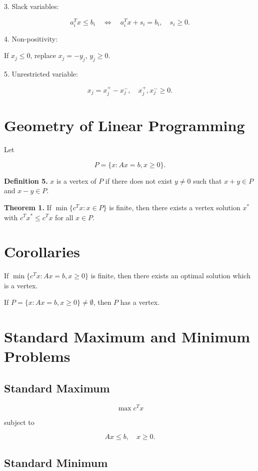 \documentclass[12pt]{article}
\begin{document}
3. Slack variables:

\[
a_i^T x \le b_i
\quad \Longleftrightarrow \quad
a_i^T x + s_i = b_i,
\quad s_i \ge 0.
\]

4. Non-positivity:

If $x_j \le 0$, replace $x_j = -y_j$, $y_j \ge 0$.

5. Unrestricted variable:

\[
x_j = x_j^+ - x_j^-,
\quad x_j^+, x_j^- \ge 0.
\]

\section{Geometry of Linear Programming}

Let

\[
P = \{x : Ax=b, x \ge 0\}.
\]

\textbf{Definition 5.}  
$x$ is a vertex of $P$ if there does not exist $y \neq 0$ such that
$x+y \in P$ and $x-y \in P$.

\textbf{Theorem 1.}  
If $\min \{c^T x : x\in P\}$ is finite, then there exists a vertex solution $x^*$ with
$c^T x^* \le c^T x$ for all $x \in P$.

\section{Corollaries}

If $\min\{c^T x : Ax=b, x\ge 0\}$ is finite, then there exists an optimal solution which is a vertex.

If $P=\{x:Ax=b, x\ge 0\}\neq \emptyset$, then $P$ has a vertex.

\section{Standard Maximum and Minimum Problems}

\subsection*{Standard Maximum}

\[
\max c^T x
\]

subject to

\[
Ax \le b,
\quad
x \ge 0.
\]

\subsection*{Standard Minimum}
\end{document}

